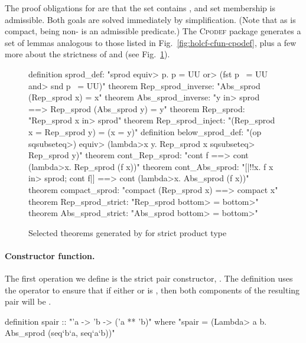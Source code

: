 \noindent
The proof obligations for  are that the set contains , and set membership is admissible. Both goals are solved immediately by simplification. (Note that as  is compact, being non- is an admissible predicate.) The \textsc{Cpodef} package generates a set of lemmas analogous to those listed in Fig.~\ref{fig:holcf-cfun-cpodef}, plus a few more about the strictness of  and  (see Fig.~\ref{fig:holcf-sprod-pcpodef}).

\begin{figure}
\begin{isabelle}
definition sprod_def: "sprod \<equiv> {p. p = UU \<or> (fst p ~= UU \<and> snd p ~= UU)}"
theorem Rep_sprod_inverse: "Abs_sprod (Rep_sprod x) = x"
theorem Abs_sprod_inverse: "y \<in> sprod ==> Rep_sprod (Abs_sprod y) = y"
theorem Rep_sprod: "Rep_sprod x \<in> sprod"
theorem Rep_sprod_inject: "(Rep_sprod x = Rep_sprod y) = (x = y)"
definition below_sprod_def: "(op \<sqsubseteq>) \<equiv> (\<lambda>x y. Rep_sprod x \<sqsubseteq> Rep_sprod y)"
theorem cont_Rep_sprod: "cont f ==> cont (\<lambda>x. Rep_sprod (f x))"
theorem cont_Abs_sprod: "[|!!x. f x \<in> sprod; cont f|] ==> cont (\<lambda>x. Abs_sprod (f x))"
theorem compact_sprod: "compact (Rep_sprod x) ==> compact x"
theorem Rep_sprod_strict: "Rep_sprod \<bottom> = \<bottom>"
theorem Abs_sprod_strict: "Abs_sprod \<bottom> = \<bottom>"
\end{isabelle}
\caption{Selected theorems generated by  for strict product type}
\label{fig:holcf-sprod-pcpodef}
\end{figure}

\paragraph{Constructor function.} The first operation we define is the strict pair constructor, . The definition uses the operator  to ensure that if either  or  is , then both components of the resulting pair will be .

\begin{isacode}
definition spair :: "'a -> 'b -> ('a ** 'b)"
  where "spair = (\<Lambda> a b. Abs_sprod (seq`b`a, seq`a`b))"
\end{isacode}

